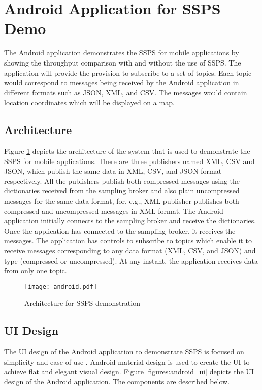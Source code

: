 \section{Android Application for SSPS Demo}

The Android application demonstrates the SSPS for mobile applications by showing the throughput comparison with and without the use of SSPS. The application will provide the provision to subscribe to a set of topics. Each topic would correspond to messages being received by the Android application in different formats such as JSON, XML, and CSV. The messages would contain location coordinates which will be displayed on a map. 

\subsection{Architecture}

Figure \ref{figures:android} depicts the architecture of the system that is used to demonstrate the SSPS for mobile applications. There are three publishers named XML, CSV and JSON, which publish the same data in XML, CSV, and JSON format respectively. All the publishers publish both compressed messages using the dictionaries received from the sampling broker and also plain uncompressed messages for the same data format, for, e.g., XML publisher publishes both compressed and uncompressed messages in XML format. The Android application initially connects to the sampling broker and receive the dictionaries. Once the application has connected to the sampling broker, it receives the messages. The application has controls to subscribe to topics which enable it to receive messages corresponding to any data format (XML, CSV, and JSON) and type (compressed or uncompressed).
At any instant, the application receives data from only one topic.

\makeatletter
\setlength{\intextsep}{20pt}
\makeatother

\begin{figure}[h!]
\centering
\texttt{[image: android.pdf]}
\caption{Architecture for SSPS demonstration}\label{figures:android}
\end{figure}

\subsection{UI Design}

The UI design of the Android application to demonstrate SSPS is focused on simplicity and ease of use \parencite{6002076}. Android material design \parencite{android2015up} is used to create the UI to achieve flat and elegant visual design. Figure \ref{figures:android_ui} depicts the UI design of the Android application. The components are described below.


